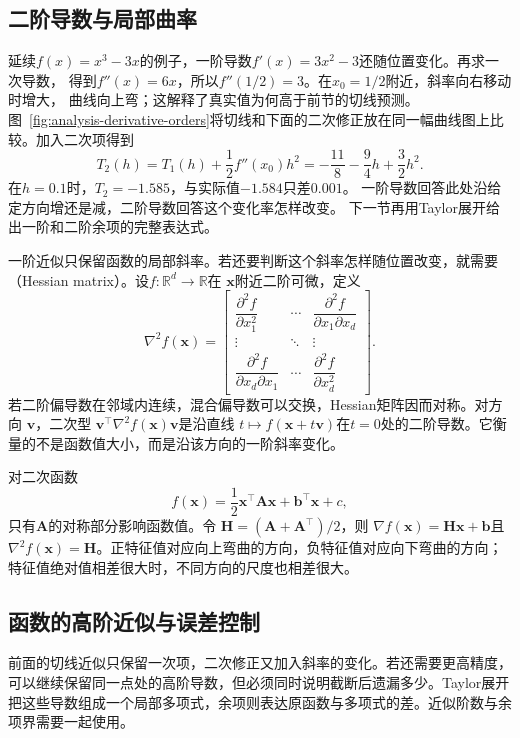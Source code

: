 \subsection{二阶导数与局部曲率}
\label{sec:analysis-second-order-curvature}

延续$f(x)=x^3-3x$的例子，一阶导数$f'(x)=3x^2-3$还随位置变化。再求一次导数，
得到$f''(x)=6x$，所以$f''(1/2)=3$。在$x_0=1/2$附近，斜率向右移动时增大，
曲线向上弯；这解释了真实值为何高于前节的切线预测。图~\ref{fig:analysis-derivative-orders}将切线和下面的二次修正放在同一幅曲线图上比较。加入二次项得到
\begin{equation}
  T_2(h)=T_1(h)+\frac12f''(x_0)h^2
        =-\frac{11}{8}-\frac94h+\frac32h^2.
\label{eq:analysis-cubic-quadratic-model}
\end{equation}
在$h=0.1$时，$T_2=-1.585$，与实际值$-1.584$只差$0.001$。
一阶导数回答此处沿给定方向增还是减，二阶导数回答这个变化率怎样改变。
下一节再用Taylor展开给出一阶和二阶余项的完整表达式。

一阶近似只保留函数的局部斜率。若还要判断这个斜率怎样随位置改变，就需要
（Hessian matrix）。设$f:\mathbb{R}^d\to\mathbb{R}$在 $\bm{x}$附近二阶可微，定义
\[   \nabla^2 f(\bm{x})   =
\begin{bmatrix}     \dfrac{\partial^2 f}{\partial x_1^2} &     \cdots &     \dfrac{\partial^2 f}{\partial x_1\partial x_d}\\     \vdots & \ddots & \vdots\\     \dfrac{\partial^2 f}{\partial x_d\partial x_1} &     \cdots &     \dfrac{\partial^2 f}{\partial x_d^2}
\end{bmatrix}. \]
若二阶偏导数在邻域内连续，混合偏导数可以交换，Hessian矩阵因而对称。对方向 $\bm{v}$，二次型 $\bm{v}^{\top}\nabla^2f(\bm{x})\bm{v}$是沿直线 $t\mapsto f(\bm{x}+t\bm{v})$在$t=0$处的二阶导数。它衡量的不是函数值大小，而是沿该方向的一阶斜率变化。

对二次函数
\[   f(\bm{x})   =   \frac12\bm{x}^{\top}\bm{A}\bm{x}   +\bm{b}^{\top}\bm{x}+c, \]
只有$\bm{A}$的对称部分影响函数值。令 $\bm{H}=(\bm{A}+\bm{A}^{\top})/2$，则 $\nabla f(\bm{x})=\bm{H}\bm{x}+\bm{b}$且 $\nabla^2f(\bm{x})=\bm{H}$。正特征值对应向上弯曲的方向，负特征值对应向下弯曲的方向；特征值绝对值相差很大时，不同方向的尺度也相差很大。

\subsection{函数的高阶近似与误差控制}
\label{sec:analysis-taylor-approximation}
前面的切线近似只保留一次项，二次修正又加入斜率的变化。若还需要更高精度，可以继续保留同一点处的高阶导数，但必须同时说明截断后遗漏多少。Taylor展开把这些导数组成一个局部多项式，余项则表达原函数与多项式的差。近似阶数与余项界需要一起使用。

